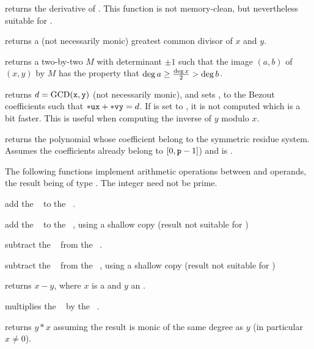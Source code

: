  returns the derivative of .
This function is not memory-clean, but nevertheless suitable for
.

 returns a (not necessarily monic)
greatest common divisor of $x$  and $y$.

 returns a two-by-two  $M$ with determinant
$\pm 1$ such that the image $(a,b)$ of $(x,y)$ by $M$ has the property that
$\deg a \geq {\deg x \over 2} > \deg b$.

 returns
$d = {\rm GCD}({\tt x},{\tt y})$ (not necessarily monic), and sets ,
 to the Bezout coefficients such that ${\tt *ux} + {\tt *vy} = d$.
If  is set to , it is not computed which is a bit faster.
This is useful when computing the inverse of $y$ modulo $x$.

 returns the polynomial whose
coefficient belong to the symmetric residue system. Assumes the coefficients
already belong to $[0,{\tt p}-1]$) and  is .


The following functions implement arithmetic operations between 
and  operands, the result being of type . The integer
 need not be prime.

 add the ~ to the
~.

 add the ~
to the ~, using a shallow copy (result not suitable for
)

 subtract the ~ from
the ~.

 subtract the
~ from the ~, using a shallow copy (result not
suitable for )

 returns $x - y$, where $x$ is
a  and $y$ an .

 multiplies the ~
by the ~.

 returns $y*x$ assuming the
result is monic of the same degree as $y$ (in particular $x\neq 0$).

